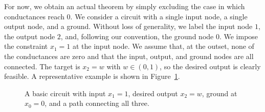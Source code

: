 \documentclass[final, 11pt, nonatbib]{elsarticle}
\theoremstyle{definition}
\theoremstyle{plain}
\numberwithin{equation}{section}
\begin{document}
For now, we obtain an actual theorem by simply excluding the case in which
conductances reach $0$.  We consider a circuit with a single input node, a
single output node, and a ground.  Without loss of generality, we label the input
node $1$, the output node $2$, and, following our convention, the ground node
$0$.  We impose the constraint $x_1 = 1$ at the input node.  We assume that, at
the outset, none of the conductances are zero and that the input, output, and
ground nodes are all connected.  The target is
$x_2 = w$ with $w\in(0,1)$, so the desired output is clearly feasible.  A
representative example is shown in Figure~\ref{fig:Basic Circuit}.
\begin{figure}[ht]
\centering
{}
\caption{A basic circuit with input $x_1 = 1$, desired output $x_2 = w$, ground
at $x_0 = 0$, and a path connecting all three.}
\label{fig:Basic Circuit}
\end{figure}
\end{document}
